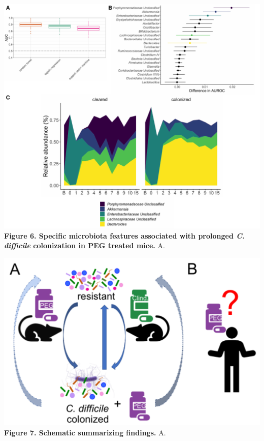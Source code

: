 \documentclass[
  11pt,
]{article}
\begin{document}
\includegraphics{figure_6.pdf} \textbf{Figure 6. Specific microbiota
features associated with prolonged \emph{C. difficile} colonization in
PEG treated mice.} A. \newpage

\includegraphics{figure_7.pdf} \textbf{Figure 7. Schematic summarizing
findings.} A. \newpage
\end{document}
